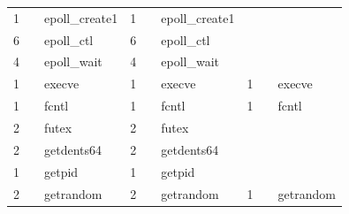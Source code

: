 \documentclass[submit,techreq,noauthor]{eco}	%
\begin{document}
\begin{table}[t]
\begin{tabular}{|lllllllll|}
  \multicolumn{1}{|l|}{1}     & \multicolumn{1}{l|}{}       & \multicolumn{1}{l|}{epoll\_create1}    & \multicolumn{1}{l|}{1}     & \multicolumn{1}{l|}{}       & \multicolumn{1}{l|}{epoll\_create1}    & \multicolumn{1}{l|}{}      & \multicolumn{1}{l|}{}       &                   \\
  \multicolumn{1}{|l|}{6}     & \multicolumn{1}{l|}{}       & \multicolumn{1}{l|}{epoll\_ctl}        & \multicolumn{1}{l|}{6}     & \multicolumn{1}{l|}{}       & \multicolumn{1}{l|}{epoll\_ctl}        & \multicolumn{1}{l|}{}      & \multicolumn{1}{l|}{}       &                   \\
  \multicolumn{1}{|l|}{4}     & \multicolumn{1}{l|}{}       & \multicolumn{1}{l|}{epoll\_wait}       & \multicolumn{1}{l|}{4}     & \multicolumn{1}{l|}{}       & \multicolumn{1}{l|}{epoll\_wait}       & \multicolumn{1}{l|}{}      & \multicolumn{1}{l|}{}       &                   \\
  \multicolumn{1}{|l|}{1}     & \multicolumn{1}{l|}{}       & \multicolumn{1}{l|}{execve}            & \multicolumn{1}{l|}{1}     & \multicolumn{1}{l|}{}       & \multicolumn{1}{l|}{execve}            & \multicolumn{1}{l|}{1}     & \multicolumn{1}{l|}{}       & execve            \\
  \multicolumn{1}{|l|}{1}     & \multicolumn{1}{l|}{}       & \multicolumn{1}{l|}{fcntl}             & \multicolumn{1}{l|}{1}     & \multicolumn{1}{l|}{}       & \multicolumn{1}{l|}{fcntl}             & \multicolumn{1}{l|}{1}     & \multicolumn{1}{l|}{}       & fcntl             \\
  \multicolumn{1}{|l|}{2}     & \multicolumn{1}{l|}{}       & \multicolumn{1}{l|}{futex}             & \multicolumn{1}{l|}{2}     & \multicolumn{1}{l|}{}       & \multicolumn{1}{l|}{futex}             & \multicolumn{1}{l|}{}      & \multicolumn{1}{l|}{}       &                   \\
  \multicolumn{1}{|l|}{2}     & \multicolumn{1}{l|}{}       & \multicolumn{1}{l|}{getdents64}        & \multicolumn{1}{l|}{2}     & \multicolumn{1}{l|}{}       & \multicolumn{1}{l|}{getdents64}        & \multicolumn{1}{l|}{}      & \multicolumn{1}{l|}{}       &                   \\
  \multicolumn{1}{|l|}{1}     & \multicolumn{1}{l|}{}       & \multicolumn{1}{l|}{getpid}            & \multicolumn{1}{l|}{1}     & \multicolumn{1}{l|}{}       & \multicolumn{1}{l|}{getpid}            & \multicolumn{1}{l|}{}      & \multicolumn{1}{l|}{}       &                   \\
  \multicolumn{1}{|l|}{2}     & \multicolumn{1}{l|}{}       & \multicolumn{1}{l|}{getrandom}         & \multicolumn{1}{l|}{2}     & \multicolumn{1}{l|}{}       & \multicolumn{1}{l|}{getrandom}         & \multicolumn{1}{l|}{1}     & \multicolumn{1}{l|}{}       & getrandom         \\

\end{tabular}
\end{table}
\end{document}
